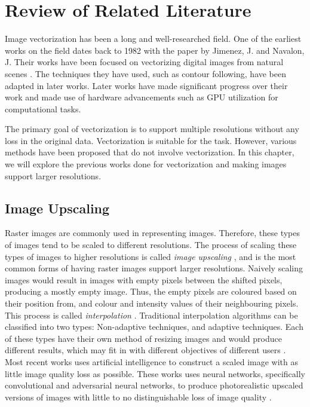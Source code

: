\chapter{Review of Related Literature} \label{sec:back}
Image vectorization has been a long and well-researched field. One of the earliest works on the field dates back to 1982 with the paper by Jimenez, J. and Navalon, J. Their works have been focused on vectorizing digital images from natural scenes \cite{somexperimentsvectorization}. The techniques they have used, such as contour following, have been adapted in later works. Later works have made significant progress over their work and made use of hardware advancements such as GPU utilization for computational tasks.

The primary goal of vectorization is to support multiple resolutions without any loss in the original data. Vectorization is suitable for the task. However, various methods have been proposed that do not involve vectorization. In this chapter, we will explore the previous works done for vectorization and making images support larger resolutions.

\section{Image Upscaling} \label{sec:image-upscaling}
Raster images are commonly used in representing images. Therefore, these types of images tend to be scaled to different resolutions. The process of scaling these types of images to higher resolutions is called \textit{image upscaling} \cite{hoshyari2018perceptiondriven}, and is the most common forms of having raster images support larger resolutions. Naively scaling images would result in images with empty pixels between the shifted pixels, producing a mostly empty image. Thus, the empty pixels are coloured based on their position from, and colour and intensity values of their neighbouring pixels. This process is called \textit{interpolation} \cite{resizingimages}. Traditional interpolation algorithms can be classified into two types: Non-adaptive techniques, and adaptive techniques. Each of these types have their own method of resizing images and would produce different results, which may fit in with different objectives of different users \cite{interpolationtechniquessurvey}. Most recent works uses artificial intelligence to construct a scaled image with as little image quality loss as possible. These works uses neural networks, specifically convolutional and adversarial neural networks, to produce photorealistic upscaled versions of images with little to no distinguishable loss of image quality \cite{aigigapixelstory}\cite{progressivesisr}\cite{sisrgan}.

